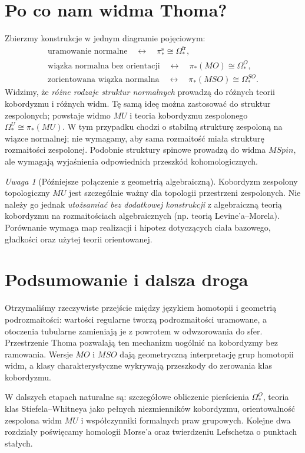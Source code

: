 \documentclass[11pt,a4paper,oneside]{report}
\theoremstyle{plain}
\theoremstyle{definition}
\theoremstyle{remark}
\newtheorem{uwaga}[twierdzenie]{Uwaga}
\begin{document}
\section{Po co nam widma Thoma?}
Zbierzmy konstrukcje w jednym diagramie pojęciowym:
\[
\begin{gathered}
\text{uramowanie normalne} \quad\longleftrightarrow\quad
\pi_*^{\mathrm s}\cong\Omega_*^{\mathrm{fr}},\\[3pt]
\text{wiązka normalna bez orientacji}\quad\longleftrightarrow\quad
\pi_*(MO)\cong\Omega_*^O,\\[3pt]
\text{zorientowana wiązka normalna}\quad\longleftrightarrow\quad
\pi_*(MSO)\cong\Omega_*^{SO}.
\end{gathered}
\]
Widzimy, że \emph{różne rodzaje struktur normalnych}
prowadzą do różnych teorii kobordyzmu i różnych widm.
Tę samą ideę można zastosować do struktur zespolonych;
powstaje widmo $MU$ i teoria kobordyzmu zespolonego
$\Omega_*^U\cong\pi_*(MU)$. W tym przypadku chodzi
o stabilną strukturę zespoloną na wiązce normalnej;
nie wymagamy, aby sama rozmaitość miała strukturę
rozmaitości zespolonej. Podobnie struktury spinowe
prowadzą do widma $MSpin$, ale wymagają wyjaśnienia
odpowiednich przeszkód kohomologicznych.

\begin{uwaga}[Późniejsze połączenie z geometrią algebraiczną]
Kobordyzm zespolony topologiczny $MU$ jest szczególnie
ważny dla topologii przestrzeni zespolonych. Nie należy
go jednak \emph{utożsamiać bez dodatkowej konstrukcji}
z algebraiczną teorią kobordyzmu na rozmaitościach
algebraicznych (np. teorią Levine'a--Morela).
Porównanie wymaga map realizacji i hipotez dotyczących
ciała bazowego, gładkości oraz użytej teorii orientowanej.
\end{uwaga}

\section{Podsumowanie i dalsza droga}
Otrzymaliśmy rzeczywiste przejście między językiem
homotopii i geometrią podrozmaitości: wartości regularne
tworzą podrozmaitości uramowane, a otoczenia tubularne
zamieniają je z powrotem w odwzorowania do sfer.
Przestrzenie Thoma pozwalają ten mechanizm uogólnić
na kobordyzmy bez ramowania. Wersje $MO$ i $MSO$
dają geometryczną interpretację grup homotopii widm,
a klasy charakterystyczne wykrywają przeszkody do
zerowania klas kobordyzmu.

W dalszych etapach naturalne są: szczegółowe obliczenie
pierścienia $\Omega_*^O$, teoria klas Stiefela--Whitneya
jako pełnych niezmienników kobordyzmu, orientowalność
zespolona widm $MU$ i współczynniki formalnych praw
grupowych. Kolejne dwa rozdziały poświęcamy homologii Morse'a oraz
twierdzeniu Lefschetza o punktach stałych.
\end{document}
